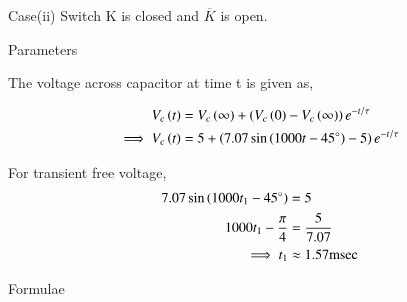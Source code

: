 \documentclass[journal,12pt,twocolumn]{IEEEtran}
\begin{document}
\newpage
Case(ii) Switch K is closed and $\overline{K}$ is open.

\begin{figure}[h!]
  \centering
  \resizebox{0.55\columnwidth}{!}{}
\end{figure}

\begin{table}[ht]
    
    \caption{Parameters}
    \label{tab:Gate.ee.54.1}
\end{table}

The voltage across capacitor at time t is given as,

\begin{align}
    V_c\left(t\right) &= V_c\left(\infty\right)+\left(V_c\left(0\right)-V_c\left(\infty\right)\right)e^{-t/ \tau}\\
    \implies V_c\left(t\right) &= 5 + \left(7.07\sin \left(1000t - 45^\circ\right)-5\right)e^{-t/ \tau}
\end{align}

For transient free voltage,
\begin{align}
    7.07\sin \left(1000t_1 - 45^\circ\right) &= 5\\
    1000t_1 - \frac{\pi}{4} &= \frac{5}{7.07}\\
    \implies t_1 &\approx 1.57 \text{msec}
\end{align}

\begin{table}[ht]
    
    \caption{Formulae}
    \label{tab:Gate.ee.54.2}
\end{table}
\end{document}
